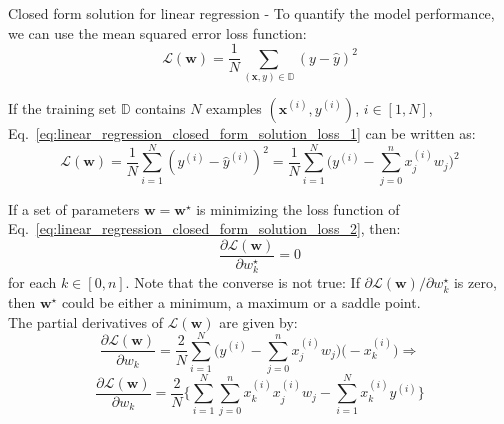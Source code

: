 \begin{frame}[t,allowframebreaks]{Closed form solution for linear regression -}
    To quantify the model performance, we can use the
     
    \gls{mean squared error loss function}:
    \begin{equation}
        \mathcal{L}(\mathbf{w}) =  
        \frac{1}{N} 
        \sum_{(\mathbf{x},y) \in \mathbb{D}} 
        (y - \hat{y})^2 
        \label{eq:linear_regression_closed_form_solution_loss_1}
    \end{equation}

    If the training set $\mathbb{D}$ contains $N$ examples 
    $(\mathbf{x}^{(i)},y^{(i)})$, $i \in [1,N]$,
    Eq.~\ref{eq:linear_regression_closed_form_solution_loss_1}
    can be written as:
    \begin{equation}
        \mathcal{L}(\mathbf{w}) =  
        \frac{1}{N} 
        \sum_{i=1}^{N} 
        (y^{(i)} - \hat{y}^{(i)})^2 =
        \frac{1}{N} 
        \sum_{i=1}^{N} 
        \Big(y^{(i)} - \sum_{j=0}^{n} x_j^{(i)} w_j\Big)^2
        \label{eq:linear_regression_closed_form_solution_loss_2}
    \end{equation}

    \framebreak


    If a set of parameters $\mathbf{w}=\mathbf{w}^\star$ 
    is minimizing the \gls{loss function} 
    of Eq.~\ref{eq:linear_regression_closed_form_solution_loss_2}, 
    then:
    \begin{equation}
        \frac{\partial \mathcal{L}(\mathbf{w})}{\partial w_k^\star} = 0
        \label{eq:linear_regression_closed_form_solution_zero_derivative}
    \end{equation}
    for each $k \in [0,n]$.
    Note that the converse is not true: 
    If $\partial \mathcal{L}(\mathbf{w})/\partial w_k^\star$ is zero, then
    $\mathbf{w}^\star$ could be either a minimum, a maximum or a saddle point.\\
    \vspace{0.2cm}
    The partial derivatives of $\mathcal{L}(\mathbf{w})$ are given by:
    \begin{equation*}
        \frac{\partial \mathcal{L}(\mathbf{w})}{\partial w_k} =
        \frac{2}{N} 
        \sum_{i=1}^{N} 
        \Big(y^{(i)} - \sum_{j=0}^{n} x_j^{(i)} w_j\Big)\Big(-x_k^{(i)}\Big) \Rightarrow
    \end{equation*}
    \begin{equation}
        \frac{\partial \mathcal{L}(\mathbf{w})}{\partial w_k} =
        \frac{2}{N} 
        \Big\{             
        \sum_{i=1}^{N} \sum_{j=0}^{n} x_k^{(i)} x_j^{(i)} w_j -
        \sum_{i=1}^{N} x_k^{(i)} y^{(i)}  
        \Big\}
        \label{eq:linear_regression_closed_form_solution_derivative_calculation}
    \end{equation}


\end{frame}
